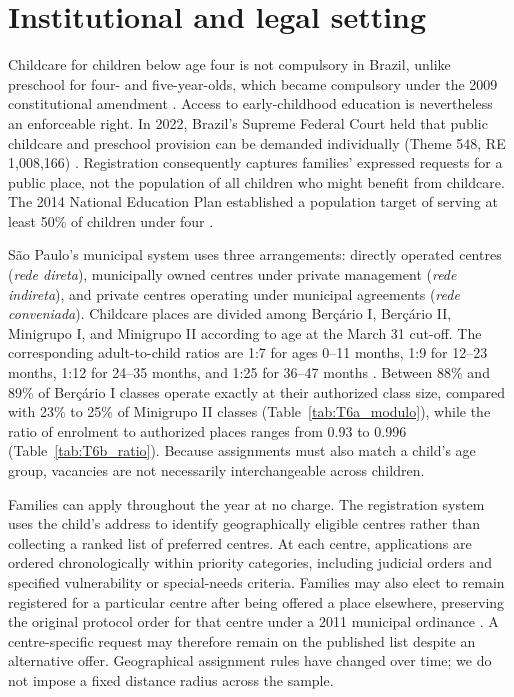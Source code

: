 
\section{Institutional and legal setting}\label{sec:institutions}

Childcare for children below age four is not compulsory in Brazil, unlike preschool for four- and five-year-olds, which became compulsory under the 2009 constitutional amendment \citep{brasil2009ec59}. Access to early-childhood education is nevertheless an enforceable right. In 2022, Brazil's Supreme Federal Court held that public childcare and preschool provision can be demanded individually (Theme 548, RE 1,008,166) \citep{stf2022tema548}. Registration consequently captures families' expressed requests for a public place, not the population of all children who might benefit from childcare. The 2014 National Education Plan established a population target of serving at least 50\% of children under four \citep{brasil2014pne}.

S\~ao Paulo's municipal system uses three arrangements: directly operated centres (\emph{rede direta}), municipally owned centres under private management (\emph{rede indireta}), and private centres operating under municipal agreements (\emph{rede conveniada}). Childcare places are divided among Ber\c{c}\'ario I, Ber\c{c}\'ario II, Minigrupo I, and Minigrupo II according to age at the March 31 cut-off. The corresponding adult-to-child ratios are 1:7 for ages 0--11 months, 1:9 for 12--23 months, 1:12 for 24--35 months, and 1:25 for 36--47 months \citep{sme2020in36}. Between 88\% and 89\% of Ber\c{c}\'ario I classes operate exactly at their authorized class size, compared with 23\% to 25\% of Minigrupo II classes (Table~\ref{tab:T6a_modulo}), while the ratio of enrolment to authorized places ranges from 0.93 to 0.996 (Table~\ref{tab:T6b_ratio}). Because assignments must also match a child's age group, vacancies are not necessarily interchangeable across children.

Families can apply throughout the year at no charge. The registration system uses the child's address to identify geographically eligible centres rather than collecting a ranked list of preferred centres. At each centre, applications are ordered chronologically within priority categories, including judicial orders and specified vulnerability or special-needs criteria. Families may also elect to remain registered for a particular centre after being offered a place elsewhere, preserving the original protocol order for that centre under a 2011 municipal ordinance \citep{sme2011portaria3478}. A centre-specific request may therefore remain on the published list despite an alternative offer. Geographical assignment rules have changed over time; we do not impose a fixed distance radius across the sample.

